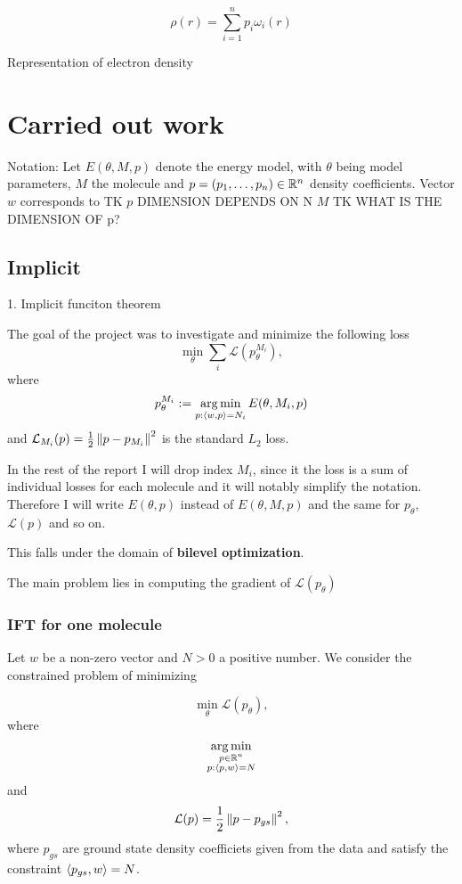 \documentclass[a4paper,10pt]{report}
\begin{document}
\begin{equation}
 \rho(r) = \sum_{i=1}^n p_i \omega_i(r)
\end{equation}


Representation of electron density
\section{Carried out work}
Notation: Let $E(\theta, M ,p)$ denote the energy model, with $\theta$ being model parameters, $M$ the molecule and $p=(p_1, \ldots ,p_n )\in \mathbb{R}^n$ density coefficients. Vector $w$ corresponds to
TK $p$ DIMENSION DEPENDS ON N $M$
TK WHAT IS THE DIMENSION OF p?

 \subsection{Implicit}
1. Implicit funciton theorem

The goal of the project was to investigate and minimize the following loss
\begin{equation}
 \min_\theta \sum_i \mathcal{L}(p_{\theta}^{M_i}),
\end{equation}
where
\begin{equation}
  p_\theta^{M_i}:=\operatorname*{arg\,min}_{p : \langle w, p \rangle=N_i} E(\theta,M_i,p)
\end{equation}
and $\mathcal{L}_{M_i}(p) = \frac{1}{2}\left\|p-p_{M_i}\right\|^2$ is the standard $L_2$ loss.

In the rest of the report I will drop index $M_i$, since it the loss is a sum of individual losses for each molecule and it will notably simplify the notation.
Therefore I will write $E(\theta,p)$ instead of $E(\theta,M,p)$ and the same for $p_\theta$, $\mathcal{L}(p)$ and so on.

This falls under the domain of \textbf{bilevel optimization}.

The main problem lies in computing the gradient of $\mathcal{L}(p_\theta)$


\subsubsection{IFT for one molecule}
Let $w$ be a non-zero vector and $N>0$ a positive number.
We consider the constrained problem of minimizing

\begin{equation}
 \min_\theta \mathcal{L}(p_\theta),
\end{equation}
where
\begin{equation}
\operatorname*{arg\,min}_{\substack{p \in \mathbb{R}^n \\ p: \langle p, w \rangle=N }}
\end{equation}
and
\begin{equation}
 \mathcal{L}(p) = \frac{1}{2} \left\|p-p_{gs}\right\|^2,
\end{equation}
where $p_{gs}$ are ground state density coefficiets given from the data and satisfy the constraint $\langle p_{gs}, w \rangle = N$.
\end{document}
